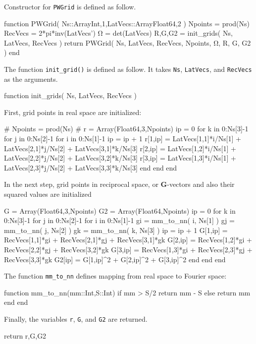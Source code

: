 \documentclass[a4paper,11pt]{extarticle}
\begin{document}
Constructor for {\tt PWGrid} is defined as follow.
\begin{juliacode}
function PWGrid( Ns::Array{Int,1},LatVecs::Array{Float64,2} )
  Npoints = prod(Ns)
  RecVecs = 2*pi*inv(LatVecs')
  Ω = det(LatVecs)
  R,G,G2 = init_grids( Ns, LatVecs, RecVecs )
  return PWGrid( Ns, LatVecs, RecVecs, Npoints, Ω, R, G, G2 )
end
\end{juliacode}

The function \verb|init_grid()| is defined as follow. It takes
\verb|Ns|, \verb|LatVecs|, and \verb|RecVecs| as the arguments.
\begin{juliacode}
function init_grids( Ns, LatVecs, RecVecs )
\end{juliacode}

First, grid points in real space are initialized:
\begin{juliacode}
  #
  Npoints = prod(Ns)
  #
  r = Array(Float64,3,Npoints)
  ip = 0
  for k in 0:Ns[3]-1
  for j in 0:Ns[2]-1
  for i in 0:Ns[1]-1
    ip = ip + 1
    r[1,ip] = LatVecs[1,1]*i/Ns[1] + LatVecs[2,1]*j/Ns[2]
              + LatVecs[3,1]*k/Ns[3]
    r[2,ip] = LatVecs[1,2]*i/Ns[1] + LatVecs[2,2]*j/Ns[2]
              + LatVecs[3,2]*k/Ns[3]
    r[3,ip] = LatVecs[1,3]*i/Ns[1] + LatVecs[2,3]*j/Ns[2]
              + LatVecs[3,3]*k/Ns[3]
  end
  end
  end
\end{juliacode}

In the next step, grid points in reciprocal space, or \textbf{G}-vectors
and also their squared values are initialized
\begin{juliacode}
  G  = Array(Float64,3,Npoints)
  G2 = Array(Float64,Npoints)
  ip    = 0
  for k in 0:Ns[3]-1
  for j in 0:Ns[2]-1
  for i in 0:Ns[1]-1
    gi = mm_to_nn( i, Ns[1] )
    gj = mm_to_nn( j, Ns[2] )
    gk = mm_to_nn( k, Ns[3] )
    ip = ip + 1
    G[1,ip] = RecVecs[1,1]*gi + RecVecs[2,1]*gj + RecVecs[3,1]*gk
    G[2,ip] = RecVecs[1,2]*gi + RecVecs[2,2]*gj + RecVecs[3,2]*gk
    G[3,ip] = RecVecs[1,3]*gi + RecVecs[2,3]*gj + RecVecs[3,3]*gk
    G2[ip] = G[1,ip]^2 + G[2,ip]^2 + G[3,ip]^2
  end
  end
  end
\end{juliacode}

The function {\tt mm\_to\_nn} defines mapping from real space to Fourier space:
\begin{juliacode}
function mm_to_nn(mm::Int,S::Int)
  if mm > S/2
    return mm - S
  else
    return mm
  end
end
\end{juliacode}

Finally, the variables \verb|r|, \verb|G|, and \verb|G2| are returned.
\begin{juliacode}
  return r,G,G2
\end{juliacode}
\end{document}

